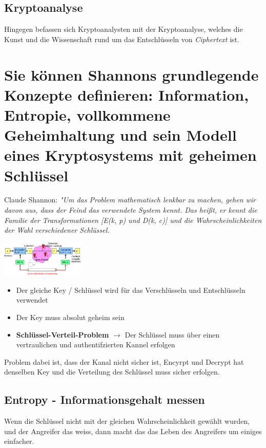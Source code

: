 \documentclass{report}
\newenvironment{Figure}
	{\par\medskip\noindent\minipage{\linewidth}}
	{\endminipage\par\medskip}
\theoremstyle{definition}
\theoremstyle{example}
\begin{document}
	
	\subsection{Kryptoanalyse}
Hingegen befassen sich Kryptoanalysten mit der Kryptoanalyse, welches die Kunst und die Wissenschaft rund um das Entschlüsseln von \textit{Ciphertext} ist.

\section{Sie können Shannons grundlegende Konzepte definieren: Information, Entropie, vollkommene Geheimhaltung und sein Modell eines Kryptosystems mit geheimen Schlüssel}
Claude Shannon: \textit{"Um das Problem mathematisch lenkbar zu machen, gehen wir davon aus, dass der Feind das verwendete System kennt. Das heißt, er kennt die Familie der Transformationen [E(k, p) und D(k, c)] und die Wahrscheinlichkeiten der Wahl verschiedener Schlüssel.}
\begin{Figure}
\centering
\includegraphics[width=150px]{img/ShannonsModel.png}
	\label{fig:Basic Terminology}
\end{Figure}
\begin{itemize}
	\item Der gleiche Key / Schlüssel wird für das Verschlüsseln und Entschlüsseln verwendet
	\item Der Key muss absolut geheim sein
	\item \textbf{Schlüssel-Verteil-Problem} $\rightarrow$ Der Schlüssel muss über einen vertraulichen und authentifzierten Kannel erfolgen
\end{itemize}
Problem dabei ist, dass der Kanal nicht sicher ist, Encyrpt und Decrypt hat denselben Key und die Verteilung des Schlüssel muss sicher erfolgen.

	\subsection{Entropy - Informationsgehalt messen}
Wenn die Schlüssel nicht mit der gleichen Wahrscheinlichkeit gewählt wurden, und der Angreifer das weiss, dann macht das das Leben des Angreifers um einiges einfacher.
\end{document}
